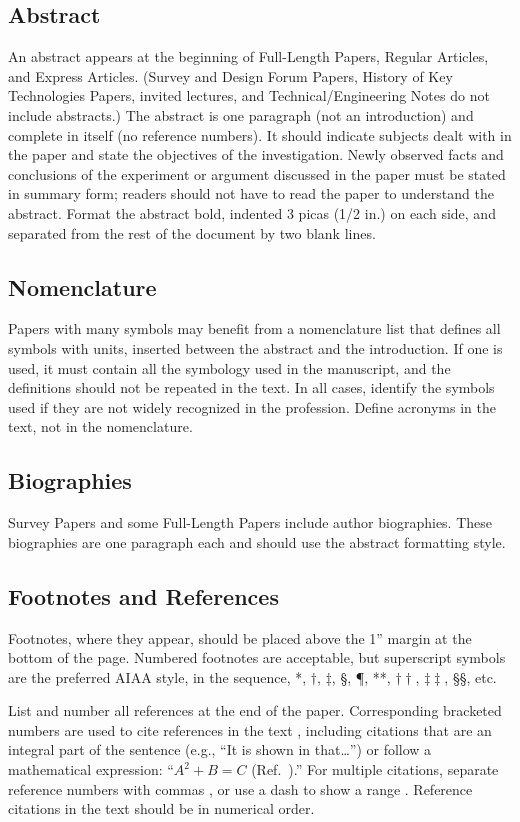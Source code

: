 \documentclass[journal ]{new-aiaa}
\begin{document}
\subsection{Abstract}
An abstract appears at the beginning of Full-Length Papers, Regular Articles, and Express Articles. (Survey and Design Forum Papers, History of Key Technologies Papers, invited lectures, and Technical/Engineering Notes do not include abstracts.) The abstract is one paragraph (not an introduction) and complete in itself (no reference numbers). It should indicate subjects dealt with in the paper and state the objectives of the investigation. Newly observed facts and conclusions of the experiment or argument discussed in the paper must be stated in summary form; readers should not have to read the paper to understand the abstract. Format the abstract bold, indented 3 picas (1/2 in.) on each side, and separated from the rest of the document by two blank lines.


\subsection{Nomenclature}
Papers with many symbols may benefit from a nomenclature list that defines all symbols with units, inserted between the abstract and the introduction. If one is used, it must contain all the symbology used in the manuscript, and the definitions should not be repeated in the text. In all cases, identify the symbols used if they are not widely recognized in the profession. Define acronyms in the text, not in the nomenclature. 

\subsection{Biographies}
Survey Papers and some Full-Length Papers include author biographies. These biographies are one paragraph each and should use the abstract formatting style.

\subsection{Footnotes and References}
Footnotes, where they appear, should be placed above the 1'' margin at the bottom of the page. Numbered footnotes are acceptable, but superscript symbols are the preferred AIAA style, in the sequence, *, $\dag$, $\ddag$, \S, \P, **, $\dag\dag$, $\ddag\ddag$, \S\S, etc.

List and number all references at the end of the paper. Corresponding bracketed numbers are used to cite references in the text \cite{vatistas1986reverse}, including citations that are an integral part of the sentence (e.g., ``It is shown in \cite{dornheim1996planetary} that\ldots '') or follow a mathematical expression: ``$A^{2} + B = C$ (Ref.~\cite{terster1997nasa}).'' For multiple citations, separate reference numbers with commas \cite{peyret2012computational,oates1997aerothermodynamics}, or use a dash to show a range \cite{volpe1994techniques,thompsonspacecraft,chi1993fluid,brandis2016nonequi}. Reference citations in the text should be in numerical order. 
\end{document}

